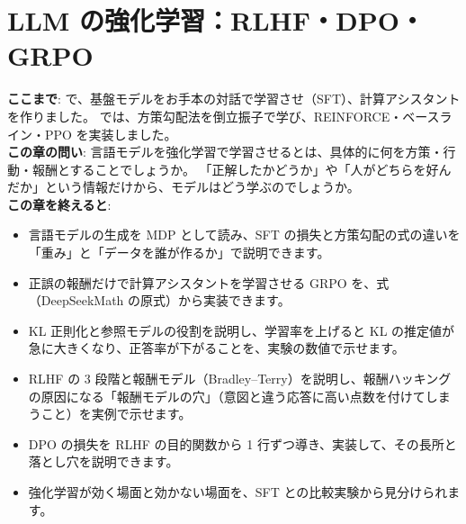 \chapter{LLM の強化学習：RLHF・DPO・GRPO}\label{ch:rl-llm}
\begin{chapterlead}
\textbf{ここまで}: で、基盤モデルをお手本の対話で学習させ（SFT）、計算アシスタント  を作りました。
では、方策勾配法を倒立振子で学び、REINFORCE・ベースライン・PPO を実装しました。\\
\textbf{この章の問い}: 言語モデルを強化学習で学習させるとは、具体的に何を方策・行動・報酬とすることでしょうか。
「正解したかどうか」や「人がどちらを好んだか」という情報だけから、モデルはどう学ぶのでしょうか。\\
\textbf{この章を終えると}:
\begin{itemize}
\item 言語モデルの生成を MDP として読み、SFT の損失と方策勾配の式の違いを「重み」と「データを誰が作るか」で説明できます。
\item 正誤の報酬だけで計算アシスタントを学習させる GRPO を、式（DeepSeekMath の原式）から実装できます。
\item KL 正則化と参照モデルの役割を説明し、学習率を上げると KL の推定値が急に大きくなり、正答率が下がることを、実験の数値で示せます。
\item RLHF の 3 段階と報酬モデル（Bradley--Terry）を説明し、報酬ハッキングの原因になる「報酬モデルの穴」（意図と違う応答に高い点数を付けてしまうこと）を実例で示せます。
\item DPO の損失を RLHF の目的関数から 1 行ずつ導き、実装して、その長所と落とし穴を説明できます。
\item 強化学習が効く場面と効かない場面を、SFT との比較実験から見分けられます。
\end{itemize}
\end{chapterlead}

